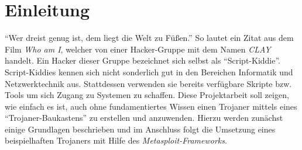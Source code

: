 \section{Einleitung}\label{sec:einleitung}
\enquote{Wer dreist genug ist, dem liegt die Welt zu Füßen.}
So lautet ein Zitat aus dem Film \textit{Who am I}, 
welcher von einer Hacker-Gruppe mit dem Namen \textit{CLAY} handelt. 
Ein Hacker dieser Gruppe bezeichnet sich selbst als \enquote{Script-Kiddie}.
Script-Kiddies kennen sich nicht sonderlich gut in den Bereichen Informatik und Netzwerktechnik aus.
Stattdessen verwenden sie bereits verfügbare Skripte bzw. Tools um sich Zugang zu Systemen zu schaffen. 
Diese Projektarbeit soll zeigen, wie einfach es ist,
auch ohne fundamentiertes Wissen einen Trojaner mittels eines \enquote{Trojaner-Baukastens} zu erstellen und anzuwenden. 
Hierzu werden zunächst einige Grundlagen beschrieben
und im Anschluss folgt die Umsetzung eines beispielhaften Trojaners mit Hilfe des \textit{Metasploit-Frameworks}.